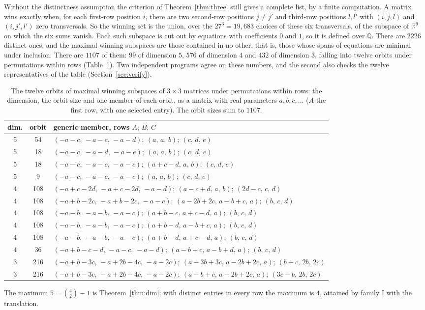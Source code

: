 \documentclass[11pt]{article}
\theoremstyle{definition}
\theoremstyle{remark}
\newcommand{\R}{\mathbb{R}}
\newcommand{\Q}{\mathbb{Q}}
\begin{document}
Without the distinctness assumption the criterion of Theorem~\ref{thm:three} still gives a complete list, by a finite computation. A matrix wins exactly when, for each first-row position $i$, there are two second-row positions $j\ne j'$ and third-row positions $l,l'$ with $(i,j,l)$ and $(i,j',l')$ zero transversals. So the winning set is the union, over the $27^3=19{,}683$ choices of these six transversals, of the subspace of $\R^9$ on which the six sums vanish. Each such subspace is cut out by equations with coefficients $0$ and $1$, so it is defined over $\Q$. There are $2226$ distinct ones, and the maximal winning subspaces are those contained in no other, that is, those whose spans of equations are minimal under inclusion. There are $1107$ of them: $99$ of dimension $5$, $576$ of dimension $4$ and $432$ of dimension $3$, falling into twelve orbits under permutations within rows (Table~\ref{tab:twelve}). Two independent programs agree on these numbers, and the second also checks the twelve representatives of the table (Section~\ref{sec:verify}).

\begin{table}[ht]
\centering\footnotesize
\setlength{\tabcolsep}{4pt}
\begin{tabular}{ccl}
\toprule
dim. & orbit & generic member, rows $A;\,B;\,C$\\
\midrule
5 & 54 & $(-a-c,\,-a-c,\,-a-d);\ (a,\,a,\,b);\ (c,\,d,\,e)$\\
5 & 18 & $(-a-c,\,-a-d,\,-a-e);\ (a,\,a,\,b);\ (c,\,d,\,e)$\\
5 & 18 & $(-a-c,\,-a-c,\,-a-c);\ (a+c-d,\,a,\,b);\ (c,\,d,\,e)$\\
5 & 9 & $(-a-c,\,-a-c,\,-a-c);\ (a,\,a,\,b);\ (c,\,d,\,e)$\\
4 & 108 & $(-a+c-2d,\,-a+c-2d,\,-a-d);\ (a-c+d,\,a,\,b);\ (2d-c,\,c,\,d)$\\
4 & 108 & $(-a+b-2c,\,-a+b-2c,\,-a-c);\ (a-2b+2c,\,a-b+c,\,a);\ (b,\,c,\,d)$\\
4 & 108 & $(-a-b,\,-a-b,\,-a-c);\ (a+b-c,\,a+c-d,\,a);\ (b,\,c,\,d)$\\
4 & 108 & $(-a-b,\,-a-b,\,-a-c);\ (a+b-d,\,a-b+c,\,a);\ (b,\,c,\,d)$\\
4 & 108 & $(-a-b,\,-a-b,\,-a-c);\ (a+b-d,\,a+c-d,\,a);\ (b,\,c,\,d)$\\
4 & 36 & $(-a+b-c-d,\,-a-c,\,-a-d);\ (a-b+c,\,a-b+d,\,a);\ (b,\,c,\,d)$\\
3 & 216 & $(-a+b-3c,\,-a+2b-4c,\,-a-2c);\ (a-3b+3c,\,a-2b+2c,\,a);\ (b+c,\,2b,\,2c)$\\
3 & 216 & $(-a+b-3c,\,-a+2b-4c,\,-a-2c);\ (a-b+c,\,a-2b+2c,\,a);\ (3c-b,\,2b,\,2c)$\\
\bottomrule
\end{tabular}
\caption{The twelve orbits of maximal winning subspaces of $3\times3$ matrices under permutations within rows: the dimension, the orbit size and one member of each orbit, as a matrix with real parameters $a,b,c,\dots$ ($A$ the first row, with one selected entry). The orbit sizes sum to $1107$.}
\label{tab:twelve}
\end{table} The maximum $5=\binom42-1$ is Theorem~\ref{thm:dim}; with distinct entries in every row the maximum is $4$, attained by family I with the translation.
\end{document}
